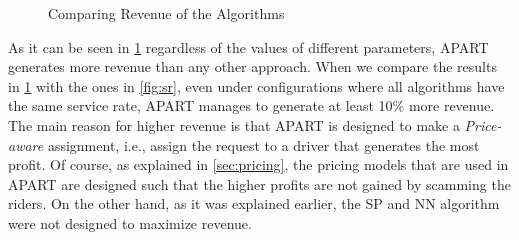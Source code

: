 \begin{figure}[h]
    \centering
    \vspace{-0.15in}
    \caption{Comparing Revenue of the Algorithms}
    \label{fig:rev}
\end{figure}

As it can be seen in \cref{fig:rev} regardless of the values of different parameters, APART generates more revenue than any other approach. When we compare the results in \cref{fig:rev} with the ones in \cref{fig:sr}, even under configurations where all algorithms have the same service rate, APART manages to generate at least 10\% more revenue. The main reason for higher revenue is that APART is designed to make a \textit{Price-aware} assignment, i.e., assign the request to a driver that generates the most profit. Of course, as explained in \cref{sec:pricing}, the pricing models that are used in APART are designed such that the higher profits are not gained by scamming the riders. On the other hand, as it was explained earlier, the SP and NN algorithm were not designed to maximize revenue.

